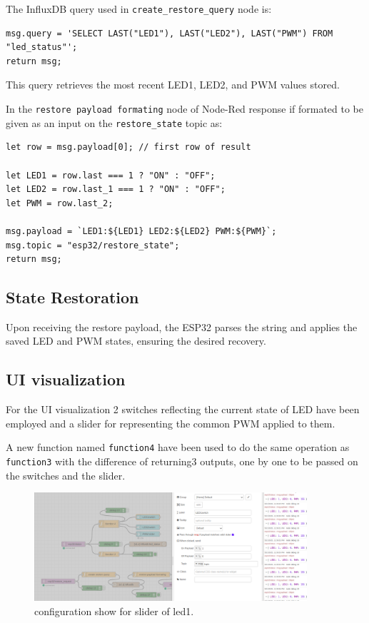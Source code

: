 \documentclass[a4paper,12pt]{article}
\begin{document}
The InfluxDB query used in \texttt{create\_restore\_query} node is:

{\scriptsize
\begin{verbatim}
msg.query = 'SELECT LAST("LED1"), LAST("LED2"), LAST("PWM") FROM "led_status"';
return msg;
\end{verbatim}
}
This query retrieves the most recent LED1, LED2, and PWM values stored.

In the \texttt{restore payload formating} node of Node-Red
response if formated to be given as an input on the \texttt{restore\_state} topic as:

{\scriptsize
\begin{verbatim}
let row = msg.payload[0]; // first row of result

let LED1 = row.last === 1 ? "ON" : "OFF";
let LED2 = row.last_1 === 1 ? "ON" : "OFF";
let PWM = row.last_2;

msg.payload = `LED1:${LED1} LED2:${LED2} PWM:${PWM}`;
msg.topic = "esp32/restore_state";
return msg;
\end{verbatim}
}

\subsection{State Restoration}

Upon receiving the restore payload, the ESP32 parses the string and applies the saved LED and PWM states, 
ensuring the desired recovery.


\subsection{UI visualization}

For the UI visualization 2 switches reflecting the current state of LED have been employed 
and a slider for representing the common PWM applied to them.

A new function named \texttt{function4} have been used to do the same operation as 
\texttt{function3} with the difference of returning3 outputs, one by one to be passed
on the switches and the slider.


		\begin{figure}[H]
			\centering
			\includegraphics[width=0.9\textwidth]{ui_conf.png}
			\caption{configuration show for slider of led1.}
			\label{fig1:}
		\end{figure}		
\end{document}
